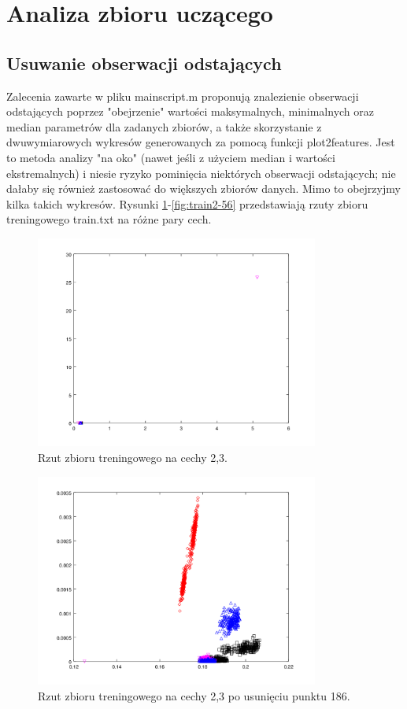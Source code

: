 \documentclass{article}
\begin{document}
	\section{Analiza zbioru uczącego} \label{sec:set_analysis}
	
	\subsection{Usuwanie obserwacji odstających} \label{sec:outliers}
	Zalecenia zawarte w pliku mainscript.m proponują znalezienie obserwacji odstających poprzez "obejrzenie" wartości maksymalnych, minimalnych oraz median parametrów dla zadanych zbiorów, a także skorzystanie z dwuwymiarowych wykresów generowanych za pomocą funkcji plot2features. Jest to metoda analizy "na oko" (nawet jeśli z użyciem median i wartości ekstremalnych) i niesie ryzyko pominięcia niektórych obserwacji odstających; nie dałaby się również zastosować do większych zbiorów danych. Mimo to obejrzyjmy kilka takich wykresów. Rysunki \ref{fig:train-23}-\ref{fig:train2-56} przedstawiają rzuty zbioru treningowego train.txt na różne pary cech. 
	\begin{figure} \centering 
		\includegraphics[height = 7cm]{plot-train-2-3.png}
		\caption[First figure]{Rzut zbioru treningowego na cechy 2,3. }
		\label{fig:train-23}
	\end{figure}
    \begin{figure} \centering 
    	\includegraphics[height = 7cm]{plot-train2-2-3.png}
    	\caption{Rzut zbioru treningowego na cechy 2,3 po usunięciu punktu 186. }
    	\label{fig:train2-23}
    \end{figure}
\end{document}
